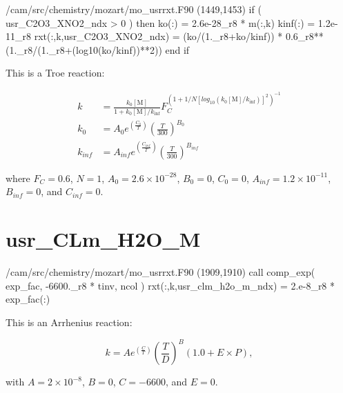 \documentclass[titlepage]{article}
\begin{document}
\begin{blockcode}[commandchars=\\\{\}]
\color{gray}/cam/src/chemistry/mozart/mo_usrrxt.F90 (1449,1453)
       if ( usr_C2O3_XNO2_ndx > 0 ) then
          ko(:)   = 2.6e-28_r8 * m(:,k)
          kinf(:) = 1.2e-11_r8
          rxt(:,k,usr_C2O3_XNO2_ndx) = (ko/(1._r8+ko/kinf)) * 0.6_r8**(1._r8/(1._r8+(log10(ko/kinf))**2))
       end if
\end{blockcode} 

This is a Troe reaction:

\begin{equation}
\begin{split}
k & = \frac{k_0[\mbox{M}]}{1+k_0[\mbox{M}]/k_{\inf}}F_C^{(1+1/N[log_{10}(k_0[\mbox{M}]/k_{\inf})]^2)^{-1}} \\
k_0 & = A_0 e^{\left( \frac{C_0}{T} \right)} \left( \frac{T}{300} \right)^{B_0} \\
k_{inf} & = A_{inf} e^{\left( \frac{C_{inf}}{T} \right)} \left( \frac{T}{300} \right)^{B_{inf}}
\end{split}
\end{equation}

\noindent where $F_C = 0.6$, $N = 1$, $A_0 = 2.6 \times 10^{-28}$, $B_0 = 0$, $C_0 = 0$, $A_{inf} = 1.2 \times 10^{-11}$, $B_{inf} = 0$, and $C_{inf} = 0$.


\section{usr\_CLm\_H2O\_M}

\begin{blockcode}[commandchars=\\\{\}]
\color{gray}/cam/src/chemistry/mozart/mo_usrrxt.F90 (1909,1910)
        call comp_exp( exp_fac, -6600._r8 * tinv, ncol )
        rxt(:,k,usr_clm_h2o_m_ndx) = 2.e-8_r8 * exp_fac(:)
\end{blockcode} 

This is an Arrhenius reaction:

\begin{equation}
k = Ae^{(\frac{C}{T})}(\frac{T}{D})^B(1.0+E \times P),
\end{equation}

\noindent with $A = 2 \times 10^{-8}$, $B = 0$, $C = -6600$, and $E = 0$.

\end{document}
